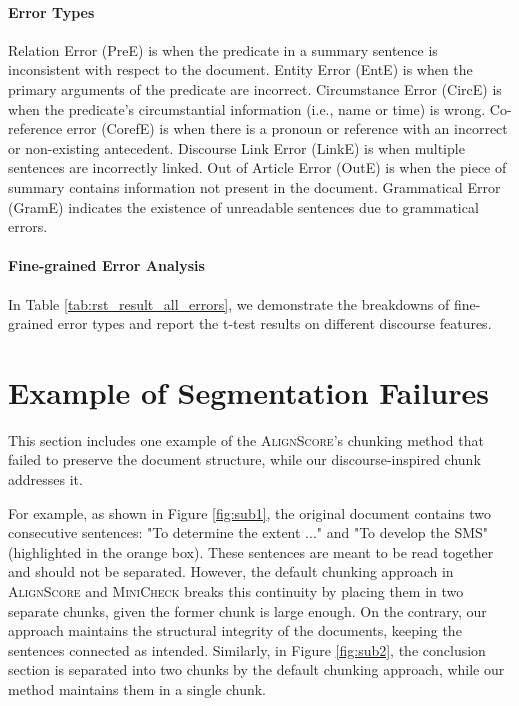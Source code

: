 \paragraph{Error Types} Relation
Error (PreE) is when the predicate in a summary sentence is inconsistent with respect to the document. Entity Error (EntE) is when the primary
arguments of the predicate are incorrect. Circumstance Error (CircE) is when the predicate’s circumstantial information (i.e., name or time) is wrong.
Co-reference error (CorefE) is when there is a pronoun or reference with an incorrect or non-existing
antecedent. Discourse Link Error (LinkE) is when
multiple sentences are incorrectly linked. Out of
Article Error (OutE) is when the piece of summary
contains information not present in the document.
Grammatical Error (GramE) indicates the existence
of unreadable sentences due to grammatical errors.



\paragraph{Fine-grained Error Analysis} In Table \ref{tab:rst_result_all_errors}, we demonstrate the breakdowns of fine-grained error types and report the t-test results on different discourse features. 


    



\section{Example of Segmentation Failures}\label{appendix:segmentation_examples}
This section includes one example of the \textsc{AlignScore}'s chunking method that failed to preserve the document structure, while our discourse-inspired chunk addresses it.

For example, as shown in Figure \ref{fig:sub1}, the original document contains two consecutive sentences: "To determine the extent ..." and "To develop the SMS" (highlighted in the orange box). These sentences are meant to be read together and should not be separated.  However, the default chunking approach in \textsc{AlignScore} and \textsc{MiniCheck} breaks this continuity by placing them in two separate chunks, given the former chunk is large enough. On the contrary, our approach maintains the structural integrity of the documents, keeping the sentences connected as intended. Similarly, in Figure \ref{fig:sub2}, the conclusion section is separated into two chunks by the default chunking approach, while our method maintains them in a single chunk.


